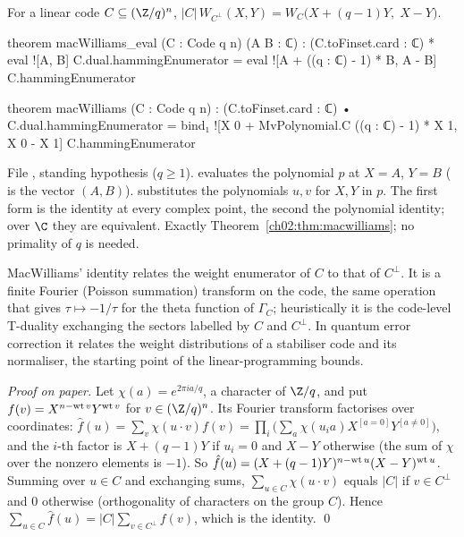 \begin{theorem}\label{ch02:thm:macwilliams}
For a linear code $C\subseteq(\Z/q)^n$,
$|C|\,W_{C^\perp}(X,Y)=W_C\bigl(X+(q-1)Y,\;X-Y\bigr)$.
\end{theorem}
\begin{leancode}
theorem macWilliams_eval (C : Code q n) (A B : ℂ) :
    (C.toFinset.card : ℂ) * eval ![A, B] C.dual.hammingEnumerator
      = eval ![A + ((q : ℂ) - 1) * B, A - B] C.hammingEnumerator

theorem macWilliams (C : Code q n) :
    (C.toFinset.card : ℂ) • C.dual.hammingEnumerator
      = bind₁ ![X 0 + MvPolynomial.C ((q : ℂ) - 1) * X 1, X 0 - X 1] C.hammingEnumerator
\end{leancode}
\begin{dictionary}
File , standing hypothesis \lean{[NeZero q]} ($q\ge1$).
 evaluates the polynomial $p$ at $X=A$, $Y=B$ (\lean{![A, B]} is the vector
$(A,B)$).   substitutes the polynomials $u,v$ for $X,Y$ in $p$.  The first
form is the identity at every complex point, the second the polynomial identity; over $\C$ they
are equivalent.  Exactly Theorem~\ref{ch02:thm:macwilliams}; no primality of $q$ is needed.
\end{dictionary}
\begin{physics}
MacWilliams' identity relates the weight enumerator of $C$ to that of $C^\perp$. It is a finite Fourier (Poisson summation) transform on the code, the same operation that gives $\tau\mapsto-1/\tau$ for the theta function of $\Gamma_C$; heuristically it is the code-level T-duality exchanging the sectors labelled by $C$ and $C^\perp$. In quantum error correction it relates the weight distributions of a stabiliser code and its normaliser, the starting point of the linear-programming bounds.
\end{physics}
\emph{Proof on paper.}  Let $\chi(a)=e^{2\pi ia/q}$, a character of $\Z/q$, and put
$f(v)=X^{n-\operatorname{wt} v}Y^{\operatorname{wt} v}$ for $v\in(\Z/q)^n$.  Its Fourier transform factorises over
coordinates: $\hat f(u)=\sum_v\chi(u\cdot v)f(v)=\prod_i\bigl(\sum_{a}\chi(u_ia)X^{[a=0]}
Y^{[a\ne0]}\bigr)$, and the $i$-th factor is $X+(q-1)Y$ if $u_i=0$ and $X-Y$ otherwise (the sum of
$\chi$ over the nonzero elements is $-1$).  So $\hat f(u)=(X+(q-1)Y)^{n-\operatorname{wt} u}(X-Y)^{\operatorname{wt}
u}$.  Summing over $u\in C$ and exchanging sums, $\sum_{u\in C}\chi(u\cdot v)$ equals $|C|$ if
$v\in C^\perp$ and $0$ otherwise (orthogonality of characters on the group $C$).  Hence
$\sum_{u\in C}\hat f(u)=|C|\sum_{v\in C^\perp}f(v)$, which is the identity.  \qed

